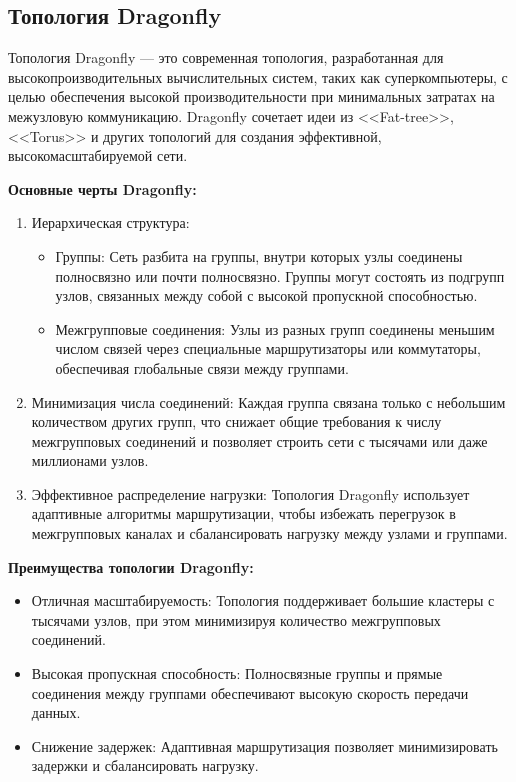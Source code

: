 \documentclass[11pt,a4paper,final]{article} %
\begin{document}
\subsection{Топология Dragonfly}

Топология Dragonfly — это современная топология, разработанная для высокопроизводительных вычислительных систем, таких как суперкомпьютеры, с целью обеспечения высокой производительности при минимальных затратах на межузловую коммуникацию. Dragonfly сочетает идеи из <<Fat-tree>>, <<Torus>> и других топологий для создания эффективной, высокомасштабируемой сети.

\textbf{Основные черты Dragonfly:}
\begin{enumerate}
	
\item Иерархическая структура:

\begin{itemize} 
	\item Группы: Сеть разбита на группы, внутри которых узлы соединены полносвязно или почти полносвязно. Группы могут состоять из подгрупп узлов, связанных между собой с высокой пропускной способностью.
	\item Межгрупповые соединения: Узлы из разных групп соединены меньшим числом связей через специальные маршрутизаторы или коммутаторы, обеспечивая глобальные связи между группами.
\end{itemize}

\item Минимизация числа соединений: Каждая группа связана только с небольшим количеством других групп, что снижает общие требования к числу межгрупповых соединений и позволяет строить сети с тысячами или даже миллионами узлов.

\item Эффективное распределение нагрузки: Топология Dragonfly использует адаптивные алгоритмы маршрутизации, чтобы избежать перегрузок в межгрупповых каналах и сбалансировать нагрузку между узлами и группами.
\end{enumerate}


\textbf{Преимущества топологии Dragonfly:}
\begin{itemize}
\item Отличная масштабируемость: Топология поддерживает большие кластеры с тысячами узлов, при этом минимизируя количество межгрупповых соединений.
\item Высокая пропускная способность: Полносвязные группы и прямые соединения между группами обеспечивают высокую скорость передачи данных.
\item Снижение задержек: Адаптивная маршрутизация позволяет минимизировать задержки и сбалансировать нагрузку.
\end{itemize}
\end{document}
